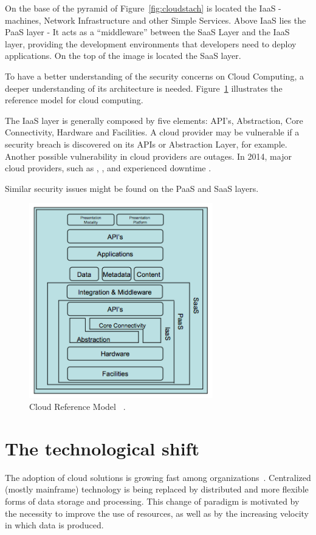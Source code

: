 On the base of the pyramid of Figure~\ref{fig:cloudstach} is located the IaaS - machines, Network Infrastructure and other Simple Services. Above IaaS lies the PaaS layer - It acts as a ``middleware'' between the SaaS Layer and the IaaS layer, providing the development environments that developers need to deploy applications. On the top of the image is located the SaaS layer. 

To have a better understanding of the security concerns on Cloud Computing, a deeper understanding of its architecture is needed. 
Figure~\ref{fig:cloudmodel} illustrates the reference model for cloud computing.

The IaaS layer is generally composed by five elements: API's, Abstraction, Core Connectivity, Hardware and Facilities. A cloud provider may be vulnerable if a security breach is discovered on its APIs or Abstraction Layer, for example. Another possible vulnerability in cloud providers are outages. In 2014, major cloud providers, such as \cite{amazonec2}, \cite{azure}, \cite{rackspace} and \cite{GAE} experienced downtime \cite{cloudoutageaudit}.

Similar security issues might be found on the PaaS and SaaS layers.

\begin{figure}[ht!]
\centering
\includegraphics[width=80mm]{Imagens/cloudreferencemodel.png}
\caption{Cloud Reference Model ~\cite{alliance2009}.\label{fig:cloudmodel}}
\end{figure}


\section{The technological shift}
The adoption of cloud solutions is growing fast among organizations~\cite{Armbrust09m.:above}.
Centralized (mostly mainframe) technology is being replaced by distributed and more flexible forms of data storage and processing.
This change of paradigm is motivated by the necessity to improve the use of resources, as well as by the increasing velocity in which data is produced.

